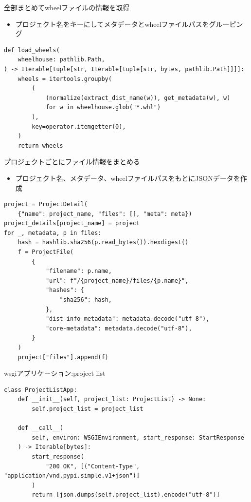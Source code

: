 \documentclass[presentation]{beamer}
\begin{document}
\begin{frame}[label={sec:org9660629},fragile]{全部まとめてwheelファイルの情報を取得}
 \begin{itemize}
\item プロジェクト名をキーにしてメタデータとwheelファイルパスをグルーピング
\end{itemize}

\begin{verbatim}
def load_wheels(
    wheelhouse: pathlib.Path,
) -> Iterable[tuple[str, Iterable[tuple[str, bytes, pathlib.Path]]]]:
    wheels = itertools.groupby(
        (
            (normalize(extract_dist_name(w)), get_metadata(w), w)
            for w in wheelhouse.glob("*.whl")
        ),
        key=operator.itemgetter(0),
    )
    return wheels
\end{verbatim}
\end{frame}
\begin{frame}[label={sec:orgb2e2e3a},fragile]{プロジェクトごとにファイル情報をまとめる}
 \begin{itemize}
\item プロジェクト名、メタデータ、wheelファイルパスをもとにJSONデータを作成
\end{itemize}


\begin{verbatim}
project = ProjectDetail(
    {"name": project_name, "files": [], "meta": meta})
project_details[project_name] = project
for _, metadata, p in files:
    hash = hashlib.sha256(p.read_bytes()).hexdigest()
    f = ProjectFile(
        {
            "filename": p.name,
            "url": f"/{project_name}/files/{p.name}",
            "hashes": {
                "sha256": hash,
            },
            "dist-info-metadata": metadata.decode("utf-8"),
            "core-metadata": metadata.decode("utf-8"),
        }
    )
    project["files"].append(f)

\end{verbatim}
\end{frame}
\begin{frame}[label={sec:orgc39d01e},fragile]{wsgiアプリケーション:project list}
 \begin{verbatim}
class ProjectListApp:
    def __init__(self, project_list: ProjectList) -> None:
        self.project_list = project_list

    def __call__(
        self, environ: WSGIEnvironment, start_response: StartResponse
    ) -> Iterable[bytes]:
        start_response(
            "200 OK", [("Content-Type", "application/vnd.pypi.simple.v1+json")]
        )
        return [json.dumps(self.project_list).encode("utf-8")]

\end{verbatim}
\end{frame}
\end{document}
